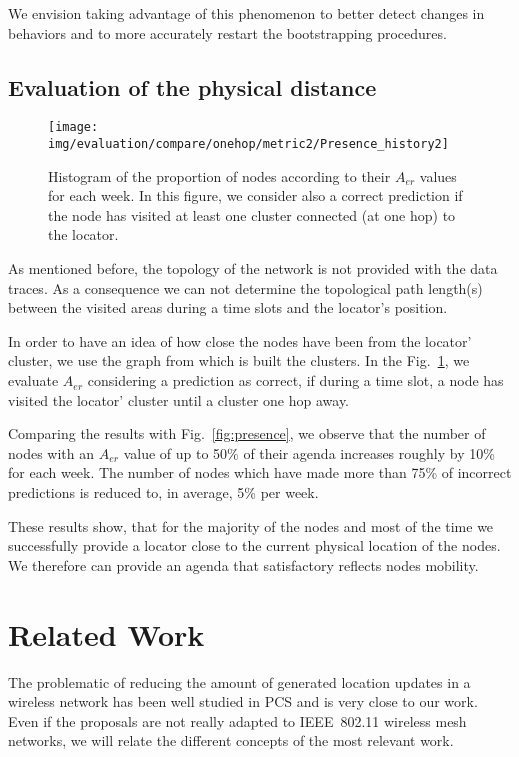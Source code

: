 \documentclass[a4paper]{sig-alternate-10pt}
\begin{document}
We envision taking advantage of  this phenomenon to better detect
changes in behaviors and to more accurately restart the
bootstrapping procedures.

\subsection{Evaluation of the physical distance}
\begin{figure}
\texttt{[image: img/evaluation/compare/onehop/metric2/Presence\_history2]}
\caption{Histogram of the proportion of nodes according to their
$A_{er}$ values for each week. In this figure, we consider also a correct
prediction if the node has visited at least one cluster connected
(at one hop) to the locator.} \label{fig:compare_onehop}
\end{figure}

As mentioned before, the topology of the network is not provided
with the data traces. As a consequence we can not determine the
topological path length(s) between the visited areas during a time
slots and the locator's position.

In order to have an idea of how close the nodes have been from the 
locator' cluster, we use the graph from which is built the clusters. 
In the Fig.~\ref {fig:compare_onehop}, we evaluate $A_{er}$ considering 
a prediction as correct, if during a time slot, a node has visited the 
locator' cluster until a cluster one hop away.

Comparing the results with Fig.~\ref{fig:presence}, we observe that
the number of nodes with an $A_{er}$ value of up to 50\% of
their agenda increases roughly by 10\% for each week. The number of
nodes  which have made more than 75\% of incorrect predictions
is reduced to, in average, 5\% per week.

These results show, that for the majority of the nodes and
most  of the time we successfully provide a locator close to the
current physical location of the nodes. We therefore can provide an
agenda that satisfactory reflects nodes  mobility.


\section{Related Work}
\label{sec:relatedwork}

The problematic of reducing the amount of generated location updates
in a wireless network has been well studied in \textsc{PCS} and is
very close to our work. Even if the proposals are not really adapted
to IEEE~802.11 wireless mesh networks, we will relate the different
concepts of the most relevant work.
\end{document}

